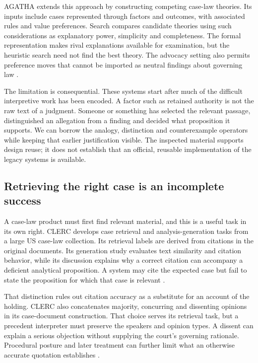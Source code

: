 AGATHA extends this approach by constructing competing case-law theories.
Its inputs include cases represented through factors and outcomes, with
associated rules and value preferences. Search compares candidate theories
using such considerations as explanatory power, simplicity and completeness.
The formal representation makes rival explanations available for examination,
but the heuristic search need not find the best theory. The advocacy setting
also permits preference moves that cannot be imported as neutral findings
about governing law \citep[secs.~2--3, 6--8 and 10]{agatha2005}.

The limitation is consequential. These systems start after much of the
difficult interpretive work has been encoded. A factor such as retained
authority is not the raw text of a judgment. Someone or something has selected
the relevant passage, distinguished an allegation from a finding and decided
what proposition it supports. We can borrow the analogy, distinction and
counterexample operators while keeping that earlier justification visible.
The inspected material supports design reuse; it does not establish that an
official, reusable implementation of the legacy systems is available.

\subsection{Retrieving the right case is an incomplete success}

A case-law product must first find relevant material, and this is a useful
task in its own right. CLERC develops case retrieval and analysis-generation
tasks from a large US case-law collection. Its retrieval labels are derived
from citations in the original documents. Its generation study evaluates
text similarity and citation behavior, while its discussion explains why a
correct citation can accompany a deficient analytical proposition. A system
may cite the expected case but fail to state the proposition for which that
case is relevant \citep[secs.~3--5, especially sec.~5.2]{clerc2024}.

That distinction rules out citation accuracy as a substitute for an account
of the holding. CLERC also concatenates majority, concurring and dissenting
opinions in its case-document construction. That choice serves its retrieval
task, but a precedent interpreter must preserve the speakers and opinion
types. A dissent can explain a serious objection without supplying the
court's governing rationale. Procedural posture and later treatment can
further limit what an otherwise accurate quotation establishes
\citep[sec.~3.1]{clerc2024}.

